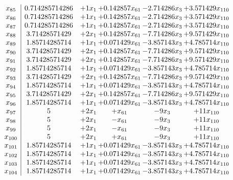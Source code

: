 \documentclass[11pt]{article}
\begin{document}
\[\begin{array}{c| c c@{\hskip 2pt} c@{\hskip 2pt} c@{\hskip 2pt} c@{\hskip 2pt} }
 x_{85}   &  0.714285714286 & + 1 x_{1} & + 0.142857 x_{61} & -2.714286 x_{3} & + 3.571429 x_{110}\\
 x_{86}   &  0.714285714286 & + 1 x_{1} & + 0.142857 x_{61} & -2.714286 x_{3} & + 3.571429 x_{110}\\
 x_{87}   &  0.714285714286 & + 1 x_{1} & + 0.142857 x_{61} & -2.714286 x_{3} & + 3.571429 x_{110}\\
 x_{88}   &  3.71428571429 & + 2 x_{1} & + 0.142857 x_{61} & -7.714286 x_{3} & + 9.571429 x_{110}\\
 x_{89}   &  1.85714285714 & + 1 x_{1} & + 0.071429 x_{61} & -3.857143 x_{3} & + 4.785714 x_{110}\\
 x_{90}   &  3.71428571429 & + 2 x_{1} & + 0.142857 x_{61} & -7.714286 x_{3} & + 9.571429 x_{110}\\
 x_{91}   &  3.71428571429 & + 2 x_{1} & + 0.142857 x_{61} & -7.714286 x_{3} & + 9.571429 x_{110}\\
 x_{92}   &  1.85714285714 & + 1 x_{1} & + 0.071429 x_{61} & -3.857143 x_{3} & + 4.785714 x_{110}\\
 x_{93}   &  3.71428571429 & + 2 x_{1} & + 0.142857 x_{61} & -7.714286 x_{3} & + 9.571429 x_{110}\\
 x_{94}   &  1.85714285714 & + 1 x_{1} & + 0.071429 x_{61} & -3.857143 x_{3} & + 4.785714 x_{110}\\
 x_{95}   &  3.71428571429 & + 2 x_{1} & + 0.142857 x_{61} & -7.714286 x_{3} & + 9.571429 x_{110}\\
 x_{96}   &  1.85714285714 & + 1 x_{1} & + 0.071429 x_{61} & -3.857143 x_{3} & + 4.785714 x_{110}\\
 x_{97}   &  5 & + 2 x_{1} & +  x_{61} & -9 x_{3} & + 11 x_{110}\\
 x_{98}   &  5 & + 2 x_{1} & - x_{61} & -9 x_{3} & + 11 x_{110}\\
 x_{99}   &  5 & + 2 x_{1} & - x_{61} & -9 x_{3} & + 11 x_{110}\\
 x_{100}   &  5 & + 2 x_{1} & +  x_{61} & -9 x_{3} & + 11 x_{110}\\
 x_{101}   &  1.85714285714 & + 1 x_{1} & + 0.071429 x_{61} & -3.857143 x_{3} & + 4.785714 x_{110}\\
 x_{102}   &  1.85714285714 & + 1 x_{1} & + 0.071429 x_{61} & -3.857143 x_{3} & + 4.785714 x_{110}\\
 x_{103}   &  1.85714285714 & + 1 x_{1} & + 0.071429 x_{61} & -3.857143 x_{3} & + 4.785714 x_{110}\\
 x_{104}   &  1.85714285714 & + 1 x_{1} & + 0.071429 x_{61} & -3.857143 x_{3} & + 4.785714 x_{110}\\

\end{array}\]
\end{document}
